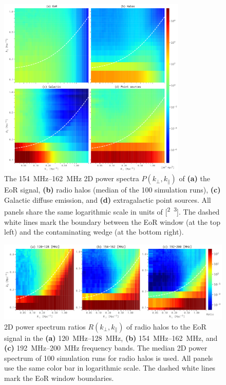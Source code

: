 \documentclass[twocolumn]{aastex62}
\newcommand{\klos}{\text{$k_{\parallel}$}}
\newcommand{\kperp}{\text{$k_{\bot}$}}
\begin{document}
\begin{figure}
  \centering
  \includegraphics[width=0.8\textwidth]{ps2d-band158}
  \caption{\label{fig:ps2d}%
    The \SIrange{154}{162}{\MHz} 2D power spectra $P(\kperp, \klos)$ of
    \textbf{(a)} the EoR signal,
    \textbf{(b)} radio halos (median of the 100 simulation runs),
    \textbf{(c)} Galactic diffuse emission,
    and
    \textbf{(d)} extragalactic point sources.
    All panels share the same logarithmic scale in units of
    [\si{\mK\squared\Mpc\cubed}].
    The dashed white lines mark the boundary between the EoR window
    (at the top left) and the contaminating wedge (at the bottom right).
  }
\end{figure}

\begin{figure}
  \centering
  \includegraphics[width=\textwidth]{ps2d-ratio-3bands}
  \caption{\label{fig:ps2d-ratio}%
    2D power spectrum ratios $R(\kperp, \klos)$ of radio halos to the
    EoR signal in the
    \textbf{(a)} \SIrange{120}{128}{\MHz},
    \textbf{(b)} \SIrange{154}{162}{\MHz}, and
    \textbf{(c)} \SIrange{192}{200}{\MHz} frequency bands.
    The median 2D power spectrum of 100 simulation runs for radio halos
    is used.
    All panels use the same color bar in logarithmic scale.
    The dashed white lines mark the EoR window boundaries.
  }
\end{figure}
\end{document}
